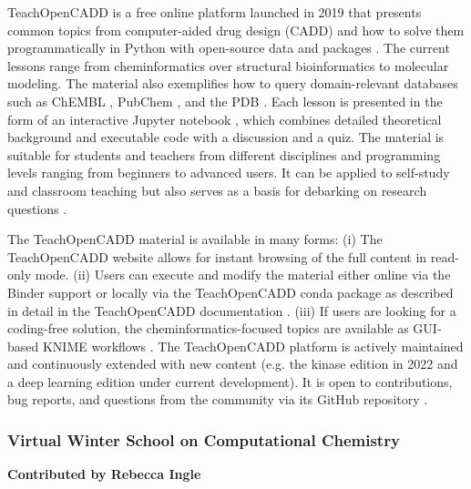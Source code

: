 \documentclass[9pt,review]{livecoms}
\begin{document}
TeachOpenCADD is a free online platform launched in 2019 that presents common topics from computer-aided drug design (CADD) and how to solve them programmatically in Python with open-source data and packages \cite{TeachOpenCADD2019, TeachOpenCADD2022, TeachOpenCADDKinaseEdition}. The current lessons range from cheminformatics over structural bioinformatics to molecular modeling. The material also exemplifies how to query domain-relevant databases such as ChEMBL \cite{Mendez_2018_ChEMBL}, PubChem \cite{Kim_2021_PubChem}, and the PDB \cite{Burley_2020_PDB}. 
Each lesson is presented in the form of an interactive Jupyter notebook \cite{Kluyver_2016_Jupyter}, which combines detailed theoretical background and executable code with a discussion and a quiz. The material is suitable for students and teachers from different disciplines and programming levels ranging from beginners to advanced users. It can be applied to self-study and classroom teaching but also serves as a basis for debarking on research questions \cite{TeachOpenCADDTeaching}. 

The TeachOpenCADD material is available in many forms: (i) The TeachOpenCADD website \cite{TOC_Website} allows for instant browsing of the full content in read-only mode. (ii) Users can execute and modify the material either online via the Binder \cite{binder} support or locally via the TeachOpenCADD conda package \cite{conda_forge_community_2015_4774216, conda_forge_toc} as described in detail in the TeachOpenCADD documentation \cite{TOC_Documentation}. (iii) If users are looking for a coding-free solution, the cheminformatics-focused topics are available as GUI-based KNIME workflows \cite{TeachOpenCADDKNIME2019}. The TeachOpenCADD platform is actively maintained and continuously extended with new content (e.g. the kinase edition in 2022 \cite{TeachOpenCADDKinaseEdition} and a deep learning edition under current development). It is open to contributions, bug reports, and questions from the community via its GitHub repository \cite{TOC_Website}.

\subsubsection{Virtual Winter School on Computational Chemistry}

\textbf{Contributed by Rebecca Ingle}
\end{document}
